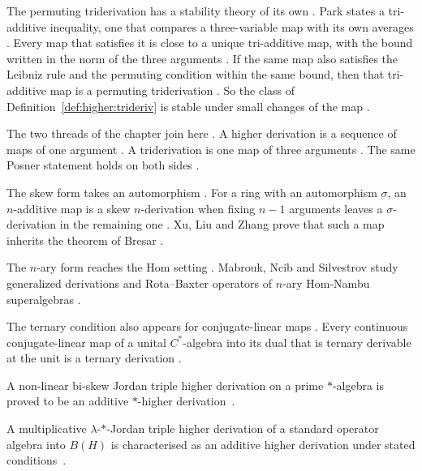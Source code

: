 The permuting triderivation has a stability theory of its own
\cite[p.~7]{Park2020Trideriv}. Park states a tri-additive inequality, one that
compares a three-variable map with its own averages \cite[Theorem~4.3,
p.~7]{Park2020Trideriv}. Every map that satisfies it is close to a unique
tri-additive map, with the bound written in the norm of the three arguments
\cite[Theorem~4.3, p.~7]{Park2020Trideriv}. If the same map also satisfies the
Leibniz rule and the permuting condition within the same bound, then that
tri-additive map is a permuting triderivation \cite[Theorem~4.3,
p.~7]{Park2020Trideriv}. So the class of Definition~\ref{def:higher:trideriv}
is stable under small changes of the map \cite[p.~1]{Park2020Trideriv}.

The two threads of the chapter join here
\cite[p.~2323]{FerreroHaetinger2002}. A higher derivation is a sequence of
maps of one argument \cite[p.~2323]{FerreroHaetinger2002}. A triderivation
is one map of three arguments \cite[p.~490]{Yazarli2017Trideriv}. The same
Posner statement holds on both sides \cite[p.~4]{Prajapati2021}.

The skew form takes an automorphism \cite[Abstract]{XuLiuZhang2013SkewN}. For
a ring with an automorphism $\sigma$, an $n$-additive map is a skew
$n$-derivation when fixing $n-1$ arguments leaves a $\sigma$-derivation in the
remaining one \cite[Abstract]{XuLiuZhang2013SkewN}. Xu, Liu and Zhang prove
that such a map inherits the theorem of Bresar
\cite[Abstract]{XuLiuZhang2013SkewN}.

The $n$-ary form reaches the Hom setting
\cite[Abstract]{MabroukNcibSilvestrov2020}. Mabrouk, Ncib and Silvestrov study
generalized derivations and Rota--Baxter operators of $n$-ary Hom-Nambu
superalgebras \cite[Abstract]{MabroukNcibSilvestrov2020}.

The ternary condition also appears for conjugate-linear maps
\cite[Abstract]{ConjugateLinearTernary2020}. Every continuous conjugate-linear
map of a unital $C^*$-algebra into its dual that is ternary derivable at the
unit is a ternary derivation \cite[Abstract]{ConjugateLinearTernary2020}.

A non-linear bi-skew Jordan triple higher derivation on a prime $*$-algebra is
proved to be an additive $*$-higher
derivation~\cite{WlNon-linearBi-skewJordan2026}.

A multiplicative $\lambda$-$*$-Jordan triple higher derivation of a standard
operator algebra into $B(H)$ is characterised as an additive higher derivation
under stated conditions~\cite{WlMultiplicativeLambda-jorda2021}.

